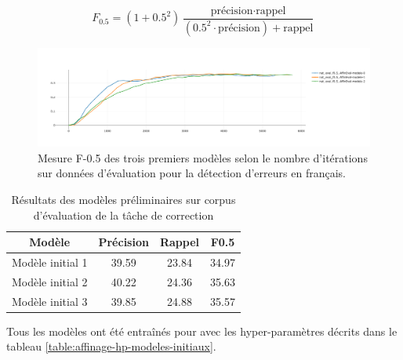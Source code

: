\documentclass[12pt,twoside,maitrise]{dms}
\theoremstyle{definition}
\numberwithin{equation}{section}
\numberwithin{table}{chapter}
\numberwithin{figure}{chapter}
\begin{document}
\begin{equation*} \label{eq:f05}
	F_{0.5}=(1+0.5^2)\frac{\text{précision}\cdot\text{rappel}}{(0.5^2 \cdot \text{précision}) + \text{rappel}}
\end{equation*}


\begin{figure}
	\begin{center}
		\includegraphics[width=1.40\textwidth]{figures/3premiersmodelesf05.png}
	\end{center}
	\caption{Mesure F-0.5 des trois premiers modèles selon le nombre d'itérations sur données d'évaluation pour la détection d'erreurs en français.}
	\label{fig:3premiermodeles}
\end{figure}

\begin{table}
	\centering
	\begin{tabular}{||c | c | c | c||}
		\hline
		Modèle           & Précision & Rappel & F0.5  \\ [0.5ex]
		\hline\hline
		Modèle initial 1 & 39.59     & 23.84  & 34.97 \\
		Modèle initial 2 & 40.22     & 24.36  & 35.63 \\
		Modèle initial 3 & 39.85     & 24.88  & 35.57 \\
		\hline
	\end{tabular}
	\caption{Résultats des modèles préliminaires sur corpus d'évaluation de la tâche de correction}
	\label{table:premiermodeles}
\end{table}
Tous les modèles ont été entraînés pour avec les hyper-paramètres décrits dans
le tableau \ref{table:affinage-hp-modeles-initiaux}.
\end{document}
